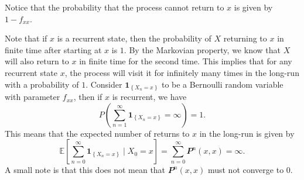 \documentclass[math, code]{amznotes}
\theoremstyle{remark}
\begin{document}
Notice that the probability that the process cannot return to $x$ is given by~$1 - f_{xx}$.

Note that if $x$ is a recurrent state, then the probability of $X$ returning to $x$ in finite time after starting at $x$ is $1$. By the Markovian property, we know that $X$ will also return to $x$ in finite time for the second time. This implies that for any recurrent state $x$, the process will visit it for infinitely many times in the long-run with a probability of $1$. Consider $\mathbf{1}_{\left\{X_n = x\right\}}$ to be a Bernoulli random variable with parameter $f_{xx}$, then if $x$ is recurrent, we have 
\begin{equation*}
    P\left(\sum_{n = 1}^{\infty}\mathbf{1}_{\left\{X_n = x\right\}} = \infty\right) = 1.
\end{equation*}
This means that the expected number of returns to $x$ in the long-run is given by
\begin{equation*}
    \mathbb{E}\left[\sum_{n = 0}^{\infty}\mathbf{1}_{\left\{X_n = x\right\}} \mid X_0 = x\right] = \sum_{n = 0}^{\infty}\mathbfit{P}^n\left(x, x\right) = \infty.
\end{equation*}
A small note is that this does not mean that $\mathbfit{P}^n\left(x, x\right)$ must not converge to $0$.
\end{document}
